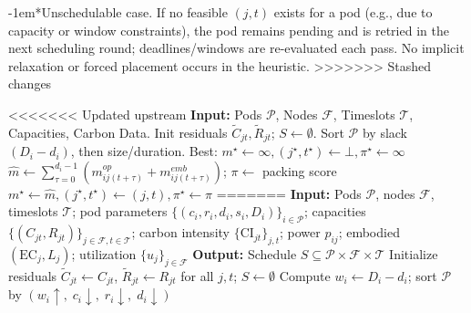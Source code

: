 \documentclass[10pt,journal,compsoc]{IEEEtran}
\makeatletter
\renewcommand{\paragraph}{\@startsection{paragraph}{4}{0pt}{1.5ex plus 1.5ex minus 0.5ex}%
{-1em}{\normalfont\normalsize\bfseries}}
\makeatother
\begin{document}
\paragraph*{Unschedulable case.}
If no feasible $(j,t)$ exists for a pod (e.g., due to capacity or window constraints), the pod remains pending and is retried in the next scheduling round; deadlines/windows are re-evaluated each pass. No implicit relaxation or forced placement occurs in the heuristic.
>>>>>>> Stashed changes

\begin{algorithm}[htbp]
\caption{TotEm Scheduler}
\label{a:totem}
\begin{algorithmic}[1]
<<<<<<< Updated upstream
\State \textbf{Input:} Pods $\mathcal{P}$, Nodes $\mathcal{F}$, Timeslots $\mathcal{T}$, Capacities, Carbon Data.
\State Init residuals $\tilde C_{jt}, \tilde R_{jt}$; $S\gets\emptyset$.
\State Sort $\mathcal{P}$ by slack $(D_i-d_i)$, then size/duration.
  \State Best: $m^\star \gets \infty, (j^\star,t^\star)\gets \bot, \pi^\star \gets \infty$
      \State $\widehat m \gets \sum_{\tau=0}^{d_i-1} (m^{op}_{ij(t+\tau)} + m^{emb}_{ij(t+\tau)})$; \quad $\pi \gets$ packing score
        \State $m^\star \gets \widehat m, (j^\star,t^\star)\gets (j,t), \pi^\star \gets \pi$
=======
\State \textbf{Input:} Pods $\mathcal{P}$, nodes $\mathcal{F}$, timeslots $\mathcal{T}$;
\Statex \hspace{2.2em} pod parameters $\{(c_i,r_i,d_i,s_i,D_i)\}_{i\in\mathcal{P}}$;
\Statex \hspace{2.2em} capacities $\{(C_{jt},R_{jt})\}_{j\in\mathcal{F},t\in\mathcal{T}}$;
\Statex \hspace{2.2em} carbon intensity $\{\mathrm{CI}_{jt}\}_{j,t}$; power $p_{ij}$; embodied $(\mathrm{EC}_j,L_j)$; utilization $\{u_j\}_{j\in\mathcal{F}}$
\State \textbf{Output:} Schedule $S \subseteq \mathcal{P}\times\mathcal{F}\times\mathcal{T}$
\State
\State Initialize residuals $\tilde C_{jt}\gets C_{jt}$, $\tilde R_{jt}\gets R_{jt}$ for all $j,t$; \quad $S\gets\emptyset$
\State Compute $w_i \gets D_i - d_i$; \quad sort $\mathcal{P}$ by $(w_i\uparrow,\; c_i\downarrow,\; r_i\downarrow,\; d_i\downarrow)$

\end{algorithmic}
\end{algorithm}
\end{document}

